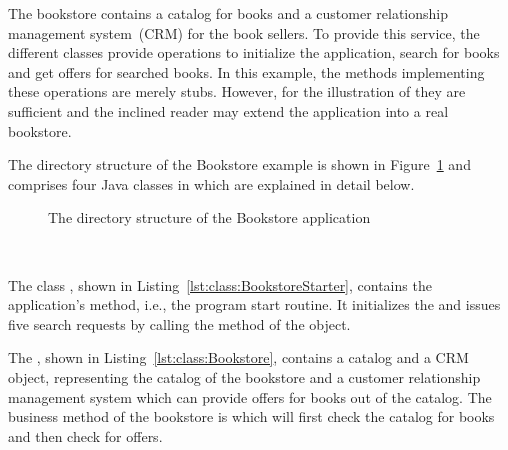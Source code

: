 The bookstore contains a catalog for books and a customer relationship %
management system~(CRM) for the book sellers. To provide this service, the different classes %
provide operations to initialize the application, search for books and get offers %
for searched books. In this example, the methods implementing these operations are %
merely stubs. However, for the illustration of \Kieker{} they are sufficient and the %
inclined reader may extend the application into a real bookstore. 

The directory structure of the Bookstore example is shown in %
Figure~\ref{fig:PlainBookstoreExample} and comprises four Java classes in %
 which are explained in detail below.

\begin{figure}[H]
\begin{graybox}
\end{graybox}

\caption{The directory structure of the Bookstore application}
\label{fig:PlainBookstoreExample}
\end{figure}


\quad\

\noindent The class , shown in Listing~\ref{lst:class:BookstoreStarter}, %
contains the application's  method, i.e., the program start routine. It initializes the  and issues five search requests by %
calling the  method of the  object.

\setJavaCodeListing



\noindent The , shown in Listing~\ref{lst:class:Bookstore}, contains a catalog and a CRM object, representing the catalog of the bookstore and a customer relationship management system which can provide offers for books out of the catalog. The business method of the bookstore is  which will first check the catalog for books and then check for offers.

